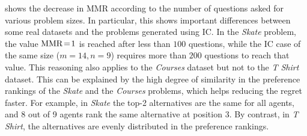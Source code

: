 \documentclass[runningheads]{llncs}
\theoremstyle{remark}
\begin{document}
 shows the decrease in MMR according to the number of questions asked for various problem sizes. In particular, this shows important differences between some real datasets and the problems generated using IC.
In the \textit{Skate} problem, the value $\operatorname{MMR}\!=\!1$ is reached after less than $100$ questions, while the IC case of the same size ($m = 14, n = 9$) requires more than $200$ questions to reach that value. This reasoning also applies to the \textit{Courses} dataset but not to the \textit{T Shirt} dataset. This can be explained by the high degree of similarity in the preference rankings of the \textit{Skate} and the \textit{Courses} problems, which helps reducing the regret faster. For example, in \textit{Skate} the top-2 alternatives are the same for all agents, and 8 out of 9 agents rank the same alternative at position 3. By contrast, in \textit{T Shirt}, the alternatives are evenly distributed in the preference rankings. 
\end{document}
